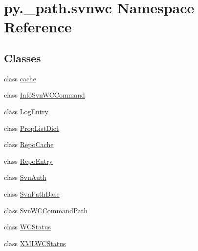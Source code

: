 \hypertarget{namespacepy_1_1__path_1_1svnwc}{}\section{py.\+\_\+path.\+svnwc Namespace Reference}
\label{namespacepy_1_1__path_1_1svnwc}
\subsection*{Classes}
\begin{DoxyCompactItemize}
\item 
class \hyperlink{classpy_1_1__path_1_1svnwc_1_1cache}{cache}
\item 
class \hyperlink{classpy_1_1__path_1_1svnwc_1_1_info_svn_w_c_command}{Info\+Svn\+W\+C\+Command}
\item 
class \hyperlink{classpy_1_1__path_1_1svnwc_1_1_log_entry}{Log\+Entry}
\item 
class \hyperlink{classpy_1_1__path_1_1svnwc_1_1_prop_list_dict}{Prop\+List\+Dict}
\item 
class \hyperlink{classpy_1_1__path_1_1svnwc_1_1_repo_cache}{Repo\+Cache}
\item 
class \hyperlink{classpy_1_1__path_1_1svnwc_1_1_repo_entry}{Repo\+Entry}
\item 
class \hyperlink{classpy_1_1__path_1_1svnwc_1_1_svn_auth}{Svn\+Auth}
\item 
class \hyperlink{classpy_1_1__path_1_1svnwc_1_1_svn_path_base}{Svn\+Path\+Base}
\item 
class \hyperlink{classpy_1_1__path_1_1svnwc_1_1_svn_w_c_command_path}{Svn\+W\+C\+Command\+Path}
\item 
class \hyperlink{classpy_1_1__path_1_1svnwc_1_1_w_c_status}{W\+C\+Status}
\item 
class \hyperlink{classpy_1_1__path_1_1svnwc_1_1_x_m_l_w_c_status}{X\+M\+L\+W\+C\+Status}
\end{DoxyCompactItemize}
